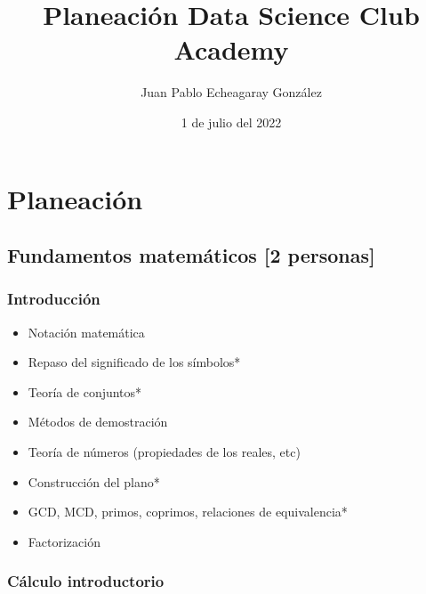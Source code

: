 \documentclass{article}
\title{Planeación Data Science Club Academy}
\author{Juan Pablo Echeagaray González}
\date{1 de julio del 2022}
\begin{document}
    \begin{titlepage}
        \maketitle
    \end{titlepage}

    \section{Planeación}

        \subsection{Fundamentos matemáticos [2 personas]}

            \subsubsection{Introducción}

                \begin{itemize}
                    \item Notación matemática
                    \item Repaso del significado de los símbolos*
                    \item Teoría de conjuntos*
                    \item Métodos de demostración
                    \item Teoría de números (propiedades de los reales, etc)
                    \item Construcción del plano*
                    \item GCD, MCD, primos, coprimos, relaciones de equivalencia*
                    \item Factorización
                \end{itemize}

            \subsubsection{Cálculo introductorio}
\end{document}

